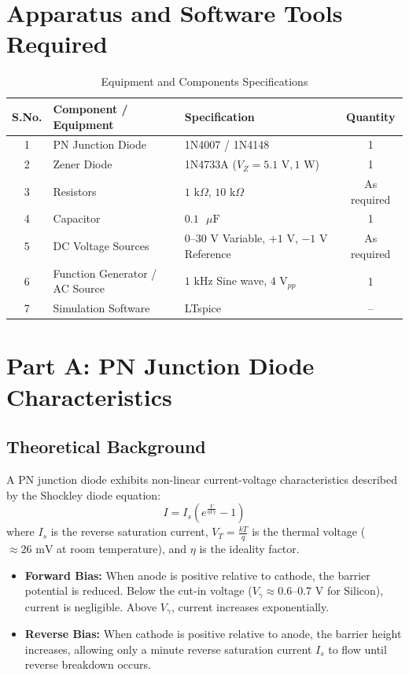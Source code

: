 \documentclass[11pt,a4paper]{article}
\begin{document}
\section{Apparatus and Software Tools Required}
\begin{table}[H]
\centering
\caption{Equipment and Components Specifications}
\begin{tabular}{cllc}
\toprule
\textbf{S.No.} & \textbf{Component / Equipment} & \textbf{Specification} & \textbf{Quantity} \\
\midrule
1 & PN Junction Diode & 1N4007 / 1N4148 & 1 \\
2 & Zener Diode & 1N4733A ($V_Z = 5.1\text{ V}, 1\text{ W}$) & 1 \\
3 & Resistors & $1\text{ k}\Omega$, $10\text{ k}\Omega$ & As required \\
4 & Capacitor & $0.1\text{ }\mu\text{F}$ & 1 \\
5 & DC Voltage Sources & $0$--$30\text{ V}$ Variable, $+1\text{ V}$, $-1\text{ V}$ Reference & As required \\
6 & Function Generator / AC Source & $1\text{ kHz}$ Sine wave, $4\text{ V}_{pp}$ & 1 \\
7 & Simulation Software & LTspice & -- \\
\bottomrule
\end{tabular}
\end{table}

\section{Part A: PN Junction Diode Characteristics}

\subsection{Theoretical Background}
A PN junction diode exhibits non-linear current-voltage characteristics described by the Shockley diode equation:
\begin{equation}
I = I_s \left( e^{\frac{V}{\eta V_T}} - 1 \right)
\end{equation}
where $I_s$ is the reverse saturation current, $V_T = \frac{k T}{q}$ is the thermal voltage ($\approx 26\text{ mV}$ at room temperature), and $\eta$ is the ideality factor.
\begin{itemize}
    \item \textbf{Forward Bias:} When anode is positive relative to cathode, the barrier potential is reduced. Below the cut-in voltage ($V_\gamma \approx 0.6\text{--}0.7\text{ V}$ for Silicon), current is negligible. Above $V_\gamma$, current increases exponentially.
    \item \textbf{Reverse Bias:} When cathode is positive relative to anode, the barrier height increases, allowing only a minute reverse saturation current $I_s$ to flow until reverse breakdown occurs.
\end{itemize}
\end{document}
